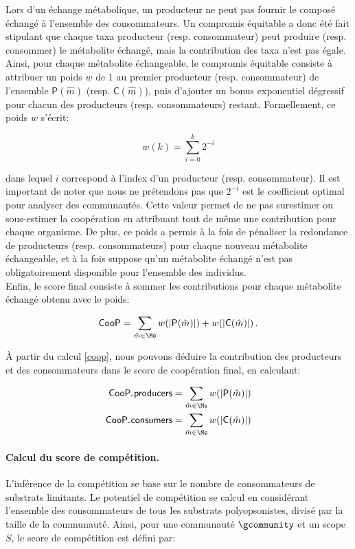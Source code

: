 \documentclass[../main.tex]{subfiles}
\begin{document}
Lors d'un échange métabolique, un producteur ne peut pas fournir le composé échangé à l'ensemble des consommateurs. Un compromis équitable a donc été fait stipulant que chaque taxa producteur (resp. consommateur) peut produire (resp. consommer) le métabolite échangé, mais la contribution des taxa n'est pas égale. Ainsi, pour chaque métabolite échangeable, le compromis équitable consiste à attribuer un poids $w$ de 1 au premier producteur (resp. consommateur) de l'ensemble $\textsf{P}(\hat{m})$ (resp. $\textsf{C}(\hat{m})$), puis d'ajouter un bonus exponentiel dégressif pour chacun des producteurs (resp. consommateurs) restant. Formellement, ce poids $w$ s'écrit:

\[
w(k) = \sum_{i=0}^k 2^{-i}
\]

 dans lequel $i$ correspond à l'index d'un producteur (resp. consommateur). Il est important de noter que nous ne prétendons pas que $2^{-i}$ est le coefficient optimal pour analyser des communautés. Cette valeur permet de ne pas surestimer ou sous-estimer la coopération en attribuant tout de même une contribution pour chaque organisme. De plus, ce poids a permis à la fois de pénaliser la redondance de producteurs (resp. consommateurs) pour chaque nouveau métabolite échangeable, et à la fois suppose qu'un métabolite échangé n'est pas obligatoirement disponible pour l'ensemble des individus. \\
 
 
 Enfin, le score final consiste à sommer les contributions pour chaque métabolite échangé obtenu avec le poids:
 
 \begin{align}
\label{coop}
    \textsf{CooP} = \sum\limits_{\hat{m}\in\Ms}
                    w(\vert\textsf{P}(\hat{m})\vert) + 
                    w(\vert\textsf{C}(\hat{m})\vert) \,.
 \end{align}

À partir du calcul \ref{coop}, nous pouvons déduire la contribution des producteurs et des consommateurs dans le score de coopération final, en calculant:

\[
\begin{split}
    \textsf{CooP\raisebox{-0.4ex}{-}producers} & = \sum\limits_{\hat{m}\in\Ms} w(\vert\textsf{P}(\hat{m})\vert) \\
    \textsf{CooP\raisebox{-0.4ex}{-}consumers} & = \sum\limits_{\hat{m}\in\Ms} w(\vert\textsf{C}(\hat{m})\vert)
\end{split}
\]

\paragraph*{Calcul du score de compétition.}
L'inférence de la compétition se base sur le nombre de consommateurs de substrats limitants. Le potentiel de compétition se calcul en considérant l'ensemble des consommateurs de tous les substrats polyopsonistes, divisé par la taille de la communauté. Ainsi, pour une communauté $\gcommunity$ et un scope $S$, le score de compétition est défini par: 
\end{document}
